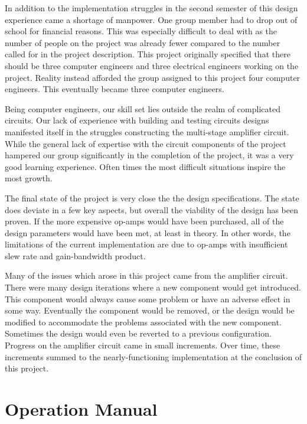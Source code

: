 \documentclass{article}	%
\begin{document}
\begin{multicols}{2}
In addition to the implementation struggles
in the second semester of this design experience
came a shortage of manpower.
One group member had to drop out of school for financial reasons.
This was especially difficult to 
deal with as the number of
people on the project was already
fewer compared to the number
called for in the project description.
This project originally specified
that there should be three computer
engineers and three electrical engineers
working on the project.
Reality instead afforded the group
assigned to this project four computer
engineers.
This eventually became
three computer engineers.

Being computer engineers,
our skill set lies outside the realm
of complicated circuits.
Our lack of experience with building and testing
circuits designs
manifested itself in the struggles constructing
the multi-stage amplifier circuit.
While the general lack of 
expertise with the circuit components
of the project hampered our group
significantly in the completion of the project,
it was a very good learning experience.
Often times the most difficult situations
inspire the most growth.

The final state of the project is
very close the the design specifications.
The state does deviate in a few key aspects,
but overall the viability of the design
has been proven.
If the more expensive op-amps would have
been purchased,
all of the design parameters would have
been met, at least in theory.
In other words,
the limitations of the current implementation
are due to op-amps with insufficient
slew rate and
gain-bandwidth product.

Many of the issues which arose in this
project came from the amplifier circuit.
There were many design iterations
where a new component would get introduced.
This component would always cause some problem or
have an adverse effect in some way.
Eventually the component would be removed,
or the design would be modified to
accommodate the problems associated with the new component.
Sometimes the design would even be reverted to
a previous configuration.
Progress on  the amplifier circuit came in
small increments.
Over time,
these increments summed to the nearly-functioning
implementation at the conclusion of this project.

\newpage
\appendix

\section{Operation Manual}

\end{multicols}
\end{document}

